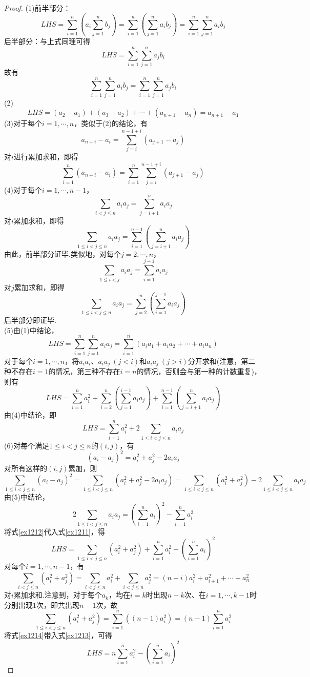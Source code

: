 \documentclass[lang=cn, zihao=5]{elegantbook}
\newcommand{\ssb}[1]{\left( #1 \right)}
\begin{document}
\begin{proof}
	(1)前半部分：$$LHS = \sum_{i=1}^{n} \ssb{a_i \sum_{j=1}^{n}b_j} = \sum_{i=1}^{n} \ssb{\sum_{j=1}^{n}a_ib_j} = \sum_{i=1}^{n}\sum_{j=1}^{n} a_ib_j$$
	后半部分：与上式同理可得$$LHS = \sum_{i=1}^{n}\sum_{j=1}^{n} a_jb_i$$
	故有$$\sum_{i=1}^{n}\sum_{j=1}^{n} a_ib_j = \sum_{i=1}^{n}\sum_{j=1}^{n} a_jb_i$$
	(2)$$LHS = (a_2-a_1) + (a_3-a_2) + \cdots + (a_{n+1}-a_n) = a_{n+1}-a_1$$
	(3)对于每个$i=1,\cdots ,n$，类似于(2)的结论，有$$a_{n+i}-a_i = \sum_{j=i}^{n-1+i}(a_{j+1}-a_j)$$
	对$i$进行累加求和，即得$$\sum_{i=1}^{n} (a_{n+i}-a_i) = \sum_{i=1}^n \sum_{j=i}^{n-1+i}(a_{j+1}-a_j)$$
	(4)对于每个$i=1, \cdots ,n-1$，$$\sum_{i<j \leq n} a_ia_j = \sum_{j=i+1}^{n} a_ia_j$$
	对$i$累加求和，即得$$\sum_{1 \leq i < j \leq n}a_ia_j = \sum_{i=1}^{n-1} \ssb{\sum_{j=i+1}^{n} a_ia_j}$$
	由此，前半部分证毕.类似地，对每个$j=2, \cdots ,n$，$$\sum_{1 \leq i<j} a_ia_j = \sum_{i=1}^{j-1} a_ia_j$$
	对$j$累加求和，即得$$\sum_{1 \leq i < j \leq n}a_ia_j = \sum_{j=2}^{n} \ssb{\sum_{i=1}^{j-1} a_ia_j}$$
	后半部分即证毕. \\
	(5)由(1)中结论，$$LHS = \sum_{i=1}^{n}\sum_{j=1}^{n} a_ia_j = \sum_{i=1}^{n} (a_ia_1+a_ia_2 + \cdots + a_ia_n)$$
	对于每个$i=1, \cdots ,n$，将$a_ia_i$、$a_ia_j~(j<i)$和$a_ia_j~(j>i)$分开求和(注意，第二种不存在$i=1$的情况，第三种不存在$i=n$的情况，否则会与第一种的计数重复)，则有$$LHS = \sum_{i=1}^{n} a_i^2 + \sum_{i=2}^{n} \ssb{\sum_{j=1}^{i-1} a_ia_j} + \sum_{i=1}^{n-1} \ssb{\sum_{j=i+1}^{n} a_ia_j}$$
	由(4)中结论，即$$LHS = \sum_{i=1}^{n} a_i^2 + 2\sum_{1 \leq i < j \leq n}a_ia_j$$
	(6)对每个满足$1 \leq i < j \leq n$的$(i,j)$，有$$(a_i-a_j)^2 = a_i^2+a_j^2-2a_ia_j$$
	对所有这样的$(i,j)$累加，则
	\begin{equation}
		\sum_{1 \leq i < j \leq n}(a_i-a_j)^2 = \sum_{1 \leq i < j \leq n} (a_i^2+a_j^2-2a_ia_j) = \sum_{1 \leq i < j \leq n}(a_i^2+a_j^2) -2\sum_{1 \leq i < j \leq n} a_ia_j \label{ex1211}
	\end{equation}
	由(5)中结论，
	\begin{equation}
		2\sum_{1 \leq i < j \leq n}a_ia_j = \ssb{\sum_{i=1}^n a_i}^2 - \sum_{i=1}^{n} a_i^2 \label{ex1212}
	\end{equation}
	将式\ref{ex1212}代入式\ref{ex1211}，得
	\begin{equation}
		LHS = \sum_{1 \leq i < j \leq n}(a_i^2+a_j^2) + \sum_{i=1}^{n} a_i^2 - \ssb{\sum_{i=1}^n a_i}^2 \label{ex1213}
	\end{equation}
	对每个$i=1, \cdots ,n-1$，有$$\sum_{i < j \leq n} (a_i^2+a_j^2) = \sum_{i < j \leq n}a_i^2 + \sum_{i < j \leq n}a_j^2 = (n-i)a_i^2 + a_{i+1}^2 + \cdots + a_n^2$$
	对$i$累加求和.注意到，对于每个$a_k$，均在$i=k$时出现$n-k$次、在$i=1,\cdots ,k-1$时分别出现$1$次，即共出现$n-1$次，故
	\begin{equation}
		\sum_{1 \leq i < j \leq n}(a_i^2+a_j^2) = \sum_{i=1}^{n} \ssb{(n-1)a_i^2} = (n-1) \sum_{i=1}^{n} a_i^2 \label{ex1214}
	\end{equation}
	将式\ref{ex1214}带入式\ref{ex1213}，可得$$LHS = n\sum_{i=1}^{n} a_i^2 - \ssb{\sum_{i=1}^{n} a_i}^2$$
\end{proof}
\end{document}
